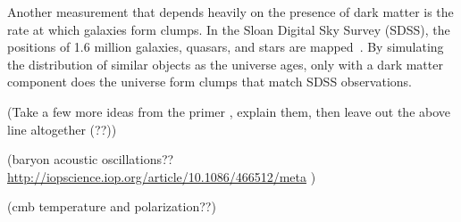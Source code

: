     Another measurement that depends heavily on the presence of dark matter is the rate at which galaxies form clumps.
    In the Sloan Digital Sky Survey (SDSS), the positions of 1.6 million galaxies, quasars, and stars are mapped~\cite{sdss_release}.
    By simulating the distribution of similar objects as the universe ages, only with a dark matter component does the universe form clumps that match SDSS observations.
  
    {\color{red}(Take a few more ideas from the primer \cite{DMPrimer}, explain them, then leave out the above line altogether (??))}

    {\color{red}(baryon acoustic oscillations?? \url{http://iopscience.iop.org/article/10.1086/466512/meta} )}
    
    {\color{red}(cmb temperature and polarization??)}
    

